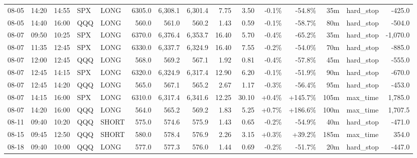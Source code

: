 \documentclass[11pt,a4paper,twoside]{article}
\begin{document}
\begin{landscape}
\begin{center}
\begin{longtable}{>{\color{txtmain}}l l l l l r r r r r r r r >{\color{txtmain}}l r}
08-05 & 14:20 & 14:55 & SPX & LONG & 6305.0 & 6,308.1 & 6,301.4 & 7.75 & 3.50 & \textcolor{lossred}{-0.1\%} & \textcolor{lossred}{-54.8\%} & 35m & hard\_stop & \textcolor{lossred}{-425.0} \\
08-05 & 14:40 & 16:00 & QQQ & LONG & 560.0 & 561.0 & 560.2 & 1.43 & 0.59 & \textcolor{lossred}{-0.1\%} & \textcolor{lossred}{-58.7\%} & 80m & hard\_stop & \textcolor{lossred}{-504.0} \\
08-07 & 09:50 & 10:25 & SPX & LONG & 6370.0 & 6,376.4 & 6,353.7 & 16.40 & 5.70 & \textcolor{lossred}{-0.4\%} & \textcolor{lossred}{-65.2\%} & 35m & hard\_stop & \textcolor{lossred}{-1,070.0} \\
08-07 & 11:35 & 12:45 & SPX & LONG & 6330.0 & 6,337.7 & 6,324.9 & 16.40 & 7.55 & \textcolor{lossred}{-0.2\%} & \textcolor{lossred}{-54.0\%} & 70m & hard\_stop & \textcolor{lossred}{-885.0} \\
08-07 & 12:00 & 12:45 & QQQ & LONG & 568.0 & 569.2 & 567.1 & 1.92 & 0.81 & \textcolor{lossred}{-0.4\%} & \textcolor{lossred}{-57.8\%} & 45m & hard\_stop & \textcolor{lossred}{-555.0} \\
08-07 & 12:45 & 14:15 & SPX & LONG & 6320.0 & 6,324.9 & 6,317.4 & 12.90 & 6.20 & \textcolor{lossred}{-0.1\%} & \textcolor{lossred}{-51.9\%} & 90m & hard\_stop & \textcolor{lossred}{-670.0} \\
08-07 & 12:45 & 14:20 & QQQ & LONG & 565.0 & 567.1 & 565.2 & 2.67 & 1.17 & \textcolor{lossred}{-0.3\%} & \textcolor{lossred}{-56.4\%} & 95m & hard\_stop & \textcolor{lossred}{-453.0} \\
08-07 & 14:15 & 16:00 & SPX & LONG & 6310.0 & 6,317.4 & 6,341.6 & 12.25 & 30.10 & \textcolor{wingreen}{+0.4\%} & \textcolor{wingreen}{+145.7\%} & 105m & max\_time & \textcolor{wingreen}{1,785.0} \\
08-07 & 14:20 & 16:00 & QQQ & LONG & 564.0 & 565.2 & 569.2 & 1.83 & 5.25 & \textcolor{wingreen}{+0.7\%} & \textcolor{wingreen}{+186.6\%} & 100m & max\_time & \textcolor{wingreen}{1,707.5} \\
08-11 & 09:40 & 10:20 & QQQ & SHORT & 575.0 & 574.6 & 575.9 & 1.43 & 0.65 & \textcolor{lossred}{-0.2\%} & \textcolor{lossred}{-54.9\%} & 40m & hard\_stop & \textcolor{lossred}{-471.0} \\
08-15 & 09:45 & 12:50 & QQQ & SHORT & 580.0 & 578.4 & 576.9 & 2.26 & 3.15 & \textcolor{wingreen}{+0.3\%} & \textcolor{wingreen}{+39.2\%} & 185m & max\_time & \textcolor{wingreen}{354.0} \\
08-18 & 09:40 & 10:00 & QQQ & LONG & 577.0 & 577.3 & 576.0 & 1.44 & 0.69 & \textcolor{lossred}{-0.2\%} & \textcolor{lossred}{-51.7\%} & 20m & hard\_stop & \textcolor{lossred}{-447.0} \\

\end{longtable}
\end{center}
\end{landscape}
\end{document}
